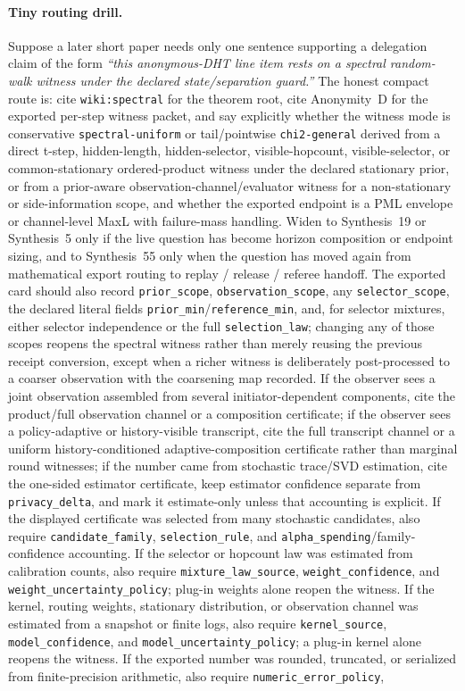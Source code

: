 \documentclass[11pt]{article}
\begin{document}
\paragraph{Tiny routing drill.}
Suppose a later short paper needs only one sentence supporting a delegation claim of the form \emph{``this anonymous-DHT line item rests on a spectral random-walk witness under the declared state/separation guard.''} The honest compact route is: cite \texttt{wiki:spectral} for the theorem root, cite Anonymity~D for the exported per-step witness packet, and say explicitly whether the witness mode is conservative \texttt{spectral-uniform} or tail/pointwise \texttt{chi2-general} derived from a direct t-step, hidden-length, hidden-selector, visible-hopcount, visible-selector, or common-stationary ordered-product witness under the declared stationary prior, or from a prior-aware observation-channel/evaluator witness for a non-stationary or side-information scope, and whether the exported endpoint is a PML envelope or channel-level MaxL with failure-mass handling. Widen to Synthesis~19 or Synthesis~5 only if the live question has become horizon composition or endpoint sizing, and to Synthesis~55 only when the question has moved again from mathematical export routing to replay / release / referee handoff. The exported card should also record \texttt{prior\_scope}, \texttt{observation\_scope}, any \texttt{selector\_scope}, the declared literal fields \nolinkurl{prior_min}/\nolinkurl{reference_min}, and, for selector mixtures, either selector independence or the full \texttt{selection\_law}; changing any of those scopes reopens the spectral witness rather than merely reusing the previous receipt conversion, except when a richer witness is deliberately post-processed to a coarser observation with the coarsening map recorded. If the observer sees a joint observation assembled from several initiator-dependent components, cite the product/full observation channel or a composition certificate; if the observer sees a policy-adaptive or history-visible transcript, cite the full transcript channel or a uniform history-conditioned adaptive-composition certificate rather than marginal round witnesses; if the number came from stochastic trace/SVD estimation, cite the one-sided estimator certificate, keep estimator confidence separate from \nolinkurl{privacy_delta}, and mark it estimate-only unless that accounting is explicit. If the displayed certificate was selected from many stochastic candidates, also require \nolinkurl{candidate_family}, \nolinkurl{selection_rule}, and \nolinkurl{alpha_spending}/family-confidence accounting. If the selector or hopcount law was estimated from calibration counts, also require \nolinkurl{mixture_law_source}, \nolinkurl{weight_confidence}, and \nolinkurl{weight_uncertainty_policy}; plug-in weights alone reopen the witness. If the kernel, routing weights, stationary distribution, or observation channel was estimated from a snapshot or finite logs, also require \nolinkurl{kernel_source}, \nolinkurl{model_confidence}, and \nolinkurl{model_uncertainty_policy}; a plug-in kernel alone reopens the witness. If the exported number was rounded, truncated, or serialized from finite-precision arithmetic, also require \nolinkurl{numeric_error_policy}, 
\end{document}
